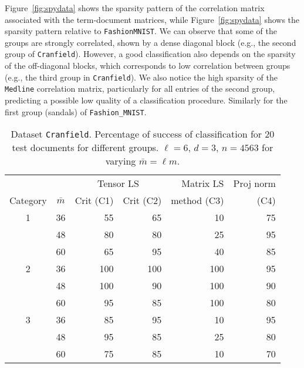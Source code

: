 \documentclass{siamart190516}
\begin{document}
Figure~\ref{fig:spydata} shows the sparsity pattern of the correlation matrix associated with the
term-document matrices,
while  Figure~\ref{fig:spydata} shows the sparsity pattern relative to
{\tt FashionMNIST}.
%
We can observe that some of the groups  are
strongly correlated, shown by a dense diagonal block (e.g., the second group of
{\tt Cranfield}). However, a good classification
also depends on the sparsity of the off-diagonal
blocks, which corresponds to low correlation between groups (e.g., the third group in {\tt Cranfield}).
We also notice the high sparsity of the
{\tt Medline} correlation matrix, particularly for all entries of the second group, predicting a possible low quality of a classification procedure.
Similarly for the first group (sandals) of 
{\tt Fashion\_MNIST}.


\begin{table}
\centering
\begin{tabular}{|c|c|rr|r|r|}
\hline
 &  &  \multicolumn{2}{c|}{Tensor LS} & Matrix LS  & Proj norm\\
Category & $\bar m$ &   Crit (C1) & Crit (C2) & method (C3) &  (C4)\\
\hline
1 & 36 &  55 & 65&10 & 75 \\
  & 48 & 80 & 80 & 25 & 95 \\
  & 60 & 65 & 95 & 40 & 85 \\
\hline
2 & 36 &100 & 100 &100 &95\\
  & 48 &100 & 90 & 100 &90 \\
  & 60 &95 &  85 & 100 & 80  \\
  \hline
3 & 36 &85 & 95 & 10 &95 \\
  & 48 & 95 & 85 & 25 & 80 \\
  & 60 & 75  & 85 &10 & 70  \\
  \hline
    \end{tabular}
    \caption{Dataset {\tt Cranfield}. Percentage of success of classification for 20 test documents for different groups.  $\ell=6$, $d=3$, $n=4563$ for varying $\bar m=\ell m$.\label{tab:cran}}
\end{table}
\end{document}
